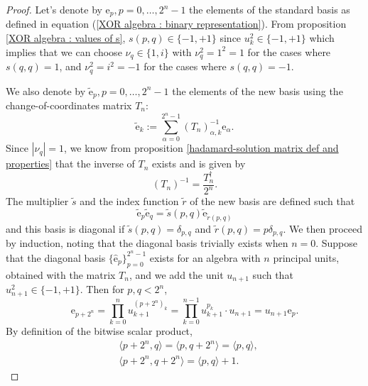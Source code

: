 \documentclass{article}
\begin{document}
\begin{proof}
    Let's denote by $\mathrm e_p, p=0,\ldots,2^n-1$ the elements of the standard basis as defined in equation (\ref{XOR algebra : binary representation}). From proposition \ref{XOR algebra : values of s}, $s(p,q) \in \{ -1, +1 \}$ since $u_k^2 \in \{ -1, +1 \}$ which implies that we can choose $\nu_q \in \{ 1,i \}$ with $\nu_q^2 = 1^2 = 1$ for the cases where $s(q,q) = 1$, and $\nu_q^2 = i^2 = -1$ for the cases where $s(q,q)=-1$. 
    
    
    We also denote by $\tilde{\mathrm{e}}_p, p=0,\ldots,2^n-1$ the elements of the new basis using the change-of-coordinates matrix $T_n$:
    $$ \tilde{\mathrm e}_k := \sum_{\alpha=0}^{2^n-1} (T_n)^{-1}_{\alpha,k} \mathrm e_\alpha. $$
    Since $|\nu_q| = 1$, we know from proposition \ref{hadamard-solution matrix def and properties} that the inverse of $T_n$ exists and is given by
    $$ (T_n)^{-1} = \frac{T_n^{\dagger}}{2^n}. $$
    The multiplier $\tilde{s}$ and the index function $\tilde{r}$ of the new basis are defined such that
    $$ \tilde{\mathrm e}_p \tilde{\mathrm e}_q = \tilde s(p,q) \tilde{\mathrm e}_{\tilde r(p,q)} $$
    and this basis is diagonal if $\tilde{s}(p,q) = \delta_{p,q}$ and $\tilde{r}(p,q) = p \delta_{p,q}$. We then proceed by induction, noting that the diagonal basis trivially exists when $n=0$. Suppose that the diagonal basis $\{ \hat{\mathrm e}_p \}_{p=0}^{2^n-1}$ exists for an algebra with $n$ principal units, obtained with the matrix $T_n$, and we add the unit $u_{n+1}$ such that $u_{n+1}^2 \in \{ -1, +1 \}$. Then for $p,q < 2^n$,
    \begin{equation}
        \label{multiperplex and multicomplex diagonal basis theorem : elements e}
        \mathrm e_{p+2^n} = \prod_{k=0}^{n} u_{k+1}^{(p+2^n)_k} = \prod_{k=0}^{n-1} u_{k+1}^{p_k} \cdot u_{n+1} = u_{n+1} \mathrm e_p.
    \end{equation}
    By definition of the bitwise scalar product,
    \begin{equation}
        \label{multiperplex and multicomplex diagonal basis theorem : bitwise scalar product}
        \begin{aligned}
            & \langle p + 2^n,q\rangle = \langle p,q + 2^n\rangle =  \langle p,q\rangle,\\
            & \langle p + 2^n,q + 2^n\rangle = \langle p,q\rangle + 1.

\end{aligned}
\end{equation}
\end{proof}
\end{document}
